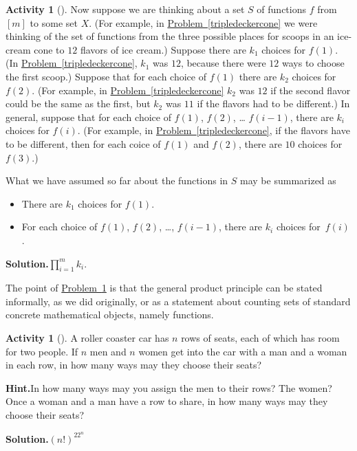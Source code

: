 \documentclass[10pt,]{book}
\theoremstyle{plain}
\theoremstyle{definition}
\newtheorem{activity}[project]{Activity}
\numberwithin{equation}{chapter}
\begin{document}
\begin{activity}[]\label{generalproductprinciple}
Now suppose we are thinking about a set \(S\) of functions \(f\) from \([m]\) to some set \(X\). (For example, in \hyperref[tripledeckercone]{Problem~\ref{tripledeckercone}} we were thinking of the set of functions from the three possible places for scoops in an ice-cream cone to \(12\) flavors of ice cream.) Suppose there are \(k_1\) choices for \(f(1)\). (In \hyperref[tripledeckercone]{Problem~\ref{tripledeckercone}}, \(k_1\) was \(12\), because there were \(12\) ways to choose the first scoop.) Suppose that for each choice of \(f(1)\) there are \(k_2\) choices for \(f(2)\). (For example, in \hyperref[tripledeckercone]{Problem~\ref{tripledeckercone}} \(k_2\) was \(12\) if the second flavor could be the same as the first, but \(k_2\) was \(11\) if the flavors had to be different.) In general, suppose that for each choice of \(f(1)\), \(f(2)\), \dots{} \(f(i-1)\), there are \(k_i\) choices for \(f(i)\). (For example, in \hyperref[tripledeckercone]{Problem~\ref{tripledeckercone}}, if the flavors have to be different, then for each coice of \(f(1)\) and \(f(2)\), there are \(10\) choices for \(f(3)\).)%
\par
What we have assumed so far about the functions in \(S\) may be summarized as \leavevmode%
\begin{itemize}[label=\textbullet]
\item{}There are \(k_1\) choices for \(f(1)\).%
\item{}For each choice of \(f(1)\), \(f(2)\), \dots{}, \(f(i-1)\), there are \(k_i\) choices for~\(f(i)\).%
\end{itemize}
%
\par\medskip\noindent%
\textbf{Solution.}\quad \(\prod_{i=1}^m k_i\).%
\end{activity}
The point of \hyperref[generalproductprinciple]{Problem~\ref{generalproductprinciple}} is that the general product principle can be stated informally, as we did originally, or as a statement about counting sets of standard concrete mathematical objects, namely functions.%
\begin{activity}[]\label{activity-15}
A roller coaster car has \(n\) rows of seats, each of which has room for two people. If \(n\) men and \(n\) women get into the car with a man and a woman in each row, in how many ways may they choose their seats?%
\par\medskip\noindent%
\textbf{Hint.}\quad In how many ways may you assign the men to their rows? The women? Once a woman and a man have a row to share, in how many ways may they choose their seats?%
\par\medskip\noindent%
\textbf{Solution.}\quad \((n!)^22^n\)%
\end{activity}
\end{document}
